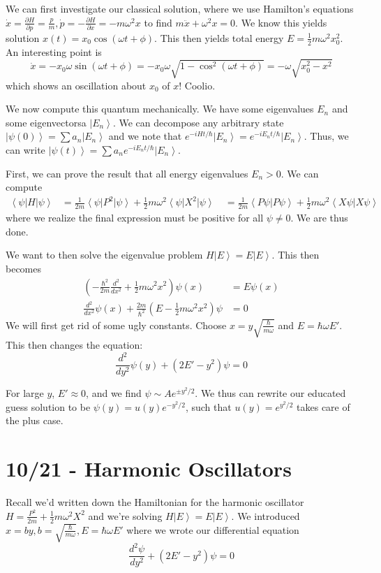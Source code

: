 \documentclass[10pt]{report}
\newcommand{\bra}[1]{\left<#1\right|}
\newcommand{\ket}[1]{\left|#1\right>}
\newcommand{\dotp}[2]{\left<#1\left.\right|#2\right>}
\newcommand{\pd}[2]{\frac{\partial #1}{\partial#2}}
\begin{document}
We can first investigate our classical solution, where we use Hamilton's equations $\dot{x} = \pd{H}{p} = \frac{p}{m}, \dot{p} = -\pd{H}{x} = -m\omega^2x$ to find $m\ddot{x} + \omega^2x = 0$. We know this yields solution $x(t)=x_0\cos(\omega t + \phi)$. This then yields total energy $E = \frac{1}{2}m\omega^2 x_0^2$. An interesting point is 
$$\dot{x} = -x_0\omega\sin (\omega t + \phi) = -x_0\omega \sqrt{1-\cos^2(\omega t + \phi)} = -\omega\sqrt{x_0^2-x^2}$$
which shows an oscillation about $x_0$ of $x$! Coolio.

We now compute this quantum mechanically. We have some eigenvalues $E_n$ and some eigenvectorsa $\ket{E_n}$. We can decompose any arbitrary state $\ket{\psi(0)} = \sum a_n \ket{E_n}$ and we note that $e^{-iHt/\hbar}\ket{E_n} = e^{-iE_n t/\hbar}\ket{E_n}$. Thus, we can write $\ket{\psi(t)} = \sum a_n e^{-iE_n t/\hbar} \ket{E_n}$. 

First, we can prove the result that all energy eigenvalues $E_n > 0$. We can compute
\begin{align}
	\bra{\psi}H\ket{\psi} &= \frac{1}{2m}\bra{\psi}P^2\ket{\psi} + \frac{1}{2}m\omega^2\bra{\psi}X^2\ket{\psi}\
	&= \frac{1}{2m}\dotp{P\psi}{P\psi} + \frac{1}{2}m\omega^2\dotp{X\psi}{X\psi}
\end{align}
where we realize the final expression must be positive for all $\psi \neq 0$. We are thus done.

We want to then solve the eigenvalue problem $H\ket{E} = E\ket{E}$. This then becomes
\begin{align}
	\left(-\frac{\hbar^2}{2m}\frac{d^2}{dx^2} + \frac{1}{2}m\omega^2x^2\right)\psi(x) &= E\psi(x)\\
	\frac{d^2}{dx^2}\psi(x) + \frac{2m}{\hbar^2}\left( E-\frac{1}{2}m\omega^2x^2 \right)\psi &= 0
\end{align}
We will first get rid of some ugly constants. Choose $x=y\sqrt{\frac{\hbar}{m\omega}}$ and $E = \hbar\omega E'$. This then changes the equation:
$$\frac{d^2}{dy^2}\psi(y) + (2E'-y^2)\psi = 0$$

For large $y$, $E' \approx 0$, and we find $\psi \sim Ae^{\pm y^2/2}$. We thus can rewrite our educated guess solution to be $\psi(y)=u(y)e^{-y^2/2}$, such that $u(y) = e^{y^2/2}$ takes care of the plus case.

\chapter{10/21 - Harmonic Oscillators}

Recall we'd written down the Hamiltonian for the harmonic oscillator $H= \frac{P^2}{2m} + \frac{1}{2}m\omega^2 X^2$ and we're solving $H\ket{E} = E\ket{E}$. We introduced $x=by,b=\sqrt{\frac{\hbar}{m\omega}}, E=\hbar\omega E'$ where we wrote our differential equation
$$\frac{d^2\psi}{dy^2} + \left( 2E'-y^2 \right)\psi=0$$
\end{document}
